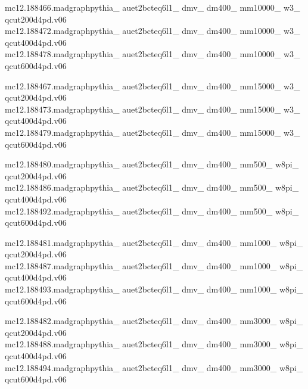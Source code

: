 mc12.188466.madgraphpythia\_ auet2bcteq6l1\_ dmv\_ dm400\_ mm10000\_ w3\_ \\ qcut200d4pd.v06\\
mc12.188472.madgraphpythia\_ auet2bcteq6l1\_ dmv\_ dm400\_ mm10000\_ w3\_ \\ qcut400d4pd.v06\\
mc12.188478.madgraphpythia\_ auet2bcteq6l1\_ dmv\_ dm400\_ mm10000\_ w3\_ \\ qcut600d4pd.v06

mc12.188467.madgraphpythia\_ auet2bcteq6l1\_ dmv\_ dm400\_ mm15000\_ w3\_ \\ qcut200d4pd.v06\\
mc12.188473.madgraphpythia\_ auet2bcteq6l1\_ dmv\_ dm400\_ mm15000\_ w3\_ \\ qcut400d4pd.v06\\
mc12.188479.madgraphpythia\_ auet2bcteq6l1\_ dmv\_ dm400\_ mm15000\_ w3\_ \\ qcut600d4pd.v06

mc12.188480.madgraphpythia\_ auet2bcteq6l1\_ dmv\_ dm400\_ mm500\_ w8pi\_ \\ qcut200d4pd.v06\\
mc12.188486.madgraphpythia\_ auet2bcteq6l1\_ dmv\_ dm400\_ mm500\_ w8pi\_ \\ qcut400d4pd.v06\\
mc12.188492.madgraphpythia\_ auet2bcteq6l1\_ dmv\_ dm400\_ mm500\_ w8pi\_ \\ qcut600d4pd.v06

mc12.188481.madgraphpythia\_ auet2bcteq6l1\_ dmv\_ dm400\_ mm1000\_ w8pi\_ \\ qcut200d4pd.v06\\
mc12.188487.madgraphpythia\_ auet2bcteq6l1\_ dmv\_ dm400\_ mm1000\_ w8pi\_ \\ qcut400d4pd.v06\\
mc12.188493.madgraphpythia\_ auet2bcteq6l1\_ dmv\_ dm400\_ mm1000\_ w8pi\_ \\ qcut600d4pd.v06

mc12.188482.madgraphpythia\_ auet2bcteq6l1\_ dmv\_ dm400\_ mm3000\_ w8pi\_ \\ qcut200d4pd.v06\\
mc12.188488.madgraphpythia\_ auet2bcteq6l1\_ dmv\_ dm400\_ mm3000\_ w8pi\_ \\ qcut400d4pd.v06\\
mc12.188494.madgraphpythia\_ auet2bcteq6l1\_ dmv\_ dm400\_ mm3000\_ w8pi\_ \\ qcut600d4pd.v06

